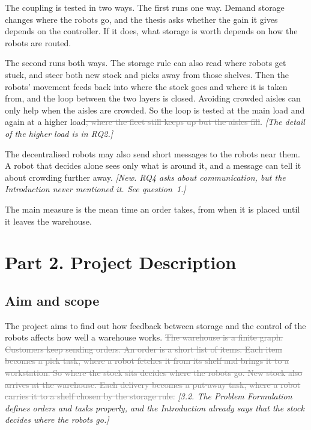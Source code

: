 \documentclass[11pt,a4paper]{article}
\newcommand{\new}[1]{\textcolor{newc}{#1}}
\newcommand{\old}[1]{\textcolor{gray}{\sout{#1}}}
\newcommand{\note}[1]{{\small\itshape [#1]}}
\begin{document}
The coupling is tested in two ways. The first runs one way. Demand storage
changes where the robots go, and the thesis asks whether the gain it gives
depends on the controller. If it does, what storage is worth depends on how
the robots are routed.

The second runs both ways. The storage rule can also read where robots get
stuck, and steer both new stock and picks away from those shelves. Then the
robots' movement feeds back into where the stock goes and where it is taken
from, and the loop between the two layers is closed. Avoiding crowded
aisles can only help when the aisles are crowded. So the loop is tested at
the main load and again at a higher load\old{, where the fleet still keeps
up but the aisles fill}.
\note{The detail of the higher load is in RQ2.}

\new{The decentralised robots may also send short messages to the robots
near them. A robot that decides alone sees only what is around it, and a
message can tell it about crowding further away.}
\note{New. RQ4 asks about communication, but the Introduction never
mentioned it. See question~1.}

The main measure is the mean time an order takes, from when it is placed
until it leaves the warehouse.

\section*{Part 2. Project Description}

\subsection*{Aim and scope}

The project aims to find out how feedback between storage and the control
of the robots affects how well a warehouse works. \old{The warehouse is a
finite graph. Customers keep sending orders. An order is a short list of
items. Each item becomes a pick task, where a robot fetches it from its
shelf and brings it to a workstation. So where the stock sits decides where
the robots go. New stock also arrives at the warehouse. Each delivery
becomes a put-away task, where a robot carries it to a shelf chosen by the
storage rule.}
\note{3.2. The Problem Formulation defines orders and tasks properly, and
the Introduction already says that the stock decides where the robots go.}
\end{document}

